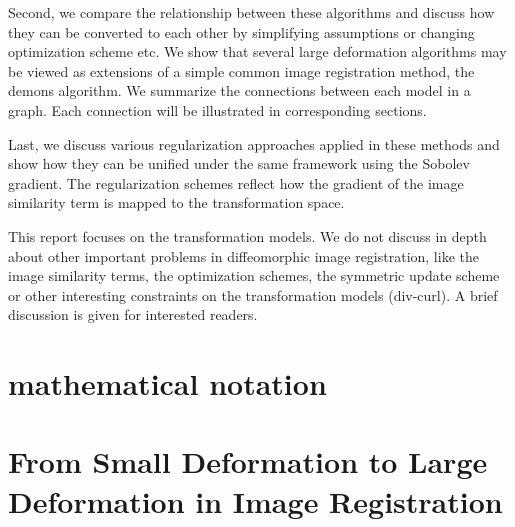 \documentclass[letterpaper,12pt]{article}
\begin{document}
Second, we compare the relationship between these algorithms and
discuss how they can be converted to each other by simplifying
assumptions or changing optimization scheme etc. We show that several
large deformation algorithms may be viewed as
extensions of a simple common image registration method, the demons algorithm. We summarize the connections between each model in a graph. Each connection will be illustrated in corresponding sections.

Last, we discuss various regularization approaches applied in these
methods and show how they can be unified under the same framework
using the Sobolev gradient. The regularization schemes reflect how the
gradient of the image similarity term is mapped to the transformation space.




This report focuses on the transformation models. We do not discuss in
depth about other important problems in diffeomorphic image
registration, like the image similarity terms, the optimization
schemes, the symmetric update scheme or other interesting constraints on the transformation models (div-curl). A brief discussion is given for interested readers.

\section{mathematical notation}

\newcommand{\vect}[1]{\mathbf{#1}}
\newcommand{\field}[1]{\mathbf{#1}}
\newcommand{\image}[1]{#1}
\newcommand{\I}{\image{I}}
\newcommand{\J}{\image{J}}
\renewcommand{\u}{\vect{u}}
\renewcommand{\v}{\vect{v}}
\renewcommand{\c}{\vect{c}}
\newcommand{\h}{\vect{h}}
\newcommand{\w}{\vect{w}}
\newcommand{\myphi}{\phi}
\newcommand{\mypsi}{\psi}
\newcommand{\D}{D}
\renewcommand{\d}{\nabla}
\newcommand{\dd}{\text{d}}
\newcommand{\p}{\partial}
\renewcommand{\L}{\Delta} %
\newcommand{\R}{\mathbb{R}}
\newcommand{\myS}{S}
\newcommand{\myR}{R}
\newcommand{\myE}{E}
\newcommand{\ld}{\langle}
\newcommand{\rd}{\rangle}
\newcommand{\LL}{\mathcal{L}} %
\newcommand{\tQ}{\mathcal{Q}}
\newcommand{\Id}{\text{Id}}
\newcommand{\tG}{{G}} %
\newcommand{\Diff}{\text{Diff}}
\newcommand{\VV}{\mathcal{V}}
\newcommand{\opL}{\mathcal{L}}

\section{From Small Deformation to Large Deformation in Image Registration}
\end{document}
